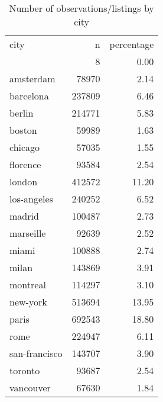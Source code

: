 \begin{table}[ht]
\centering
\begin{tabular}{lrr}
 city & n & percentage \\ 
  &   8 & 0.00 \\ 
  amsterdam & 78970 & 2.14 \\ 
  barcelona & 237809 & 6.46 \\ 
  berlin & 214771 & 5.83 \\ 
  boston & 59989 & 1.63 \\ 
  chicago & 57035 & 1.55 \\ 
  florence & 93584 & 2.54 \\ 
  london & 412572 & 11.20 \\ 
  los-angeles & 240252 & 6.52 \\ 
  madrid & 100487 & 2.73 \\ 
  marseille & 92639 & 2.52 \\ 
  miami & 100888 & 2.74 \\ 
  milan & 143869 & 3.91 \\ 
  montreal & 114297 & 3.10 \\ 
  new-york & 513694 & 13.95 \\ 
  paris & 692543 & 18.80 \\ 
  rome & 224947 & 6.11 \\ 
  san-francisco & 143707 & 3.90 \\ 
  toronto & 93687 & 2.54 \\ 
  vancouver & 67630 & 1.84 \\ 
  \end{tabular}
\caption{Number of observations/listings by city} 
\label{tab:cities}
\end{table}
